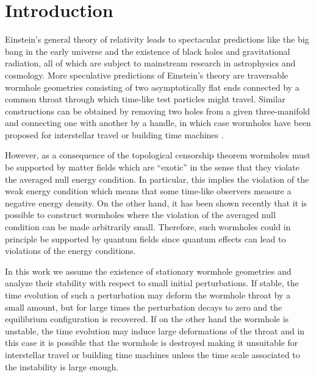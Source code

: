\documentclass[           %
               showpacs,            %
               preprintnumbers,     %
               aps,                 %
               prd,                 %
               superscriptaddress,      %
               nofootinbib,         %
               tightenlines,        %
               floats,floatfix      %
               ]{revtex4}
\begin{document}

\maketitle



\section{Introduction}

Einstein's general theory of relativity leads to spectacular
predictions like the big bang in the early universe and the existence
of black holes and gravitational radiation, all of which are subject
to mainstream research in astrophysics and cosmology. More speculative
predictions of Einstein's theory are traversable wormhole geometries
\cite{mMkT88} consisting of two asymptotically flat ends connected by
a common throat through which time-like test particles might
travel. Similar constructions can be obtained by removing two holes
from a given three-manifold and connecting one with another by a
handle, in which case wormholes have been proposed for interstellar
travel or building time machines \cite{mMkTyU88,vFiN90}.

However, as a consequence of the topological censorship theorem
\cite{jFkSdW93} wormholes must be supported by matter fields which are
``exotic'' in the sense that they violate the averaged null energy
condition. In particular, this implies the violation of the weak
energy condition which means that some time-like observers measure a
negative energy density. On the other hand, it has been shown recently
\cite{mVsKnD03} that it is possible to construct wormholes where the
violation of the averaged null condition can be made arbitrarily
small. Therefore, such wormholes could in principle be supported by
quantum fields since quantum effects can lead to violations of the
energy conditions.

In this work we assume the existence of stationary wormhole geometries
and analyze their stability with respect to small initial
perturbations. If stable, the time evolution of such a perturbation
may deform the wormhole throat by a small amount, but for large times
the perturbation decays to zero and the equilibrium configuration is
recovered. If on the other hand the wormhole is unstable, the time
evolution may induce large deformations of the throat and in this case
it is possible that the wormhole is destroyed making it unsuitable for
interstellar travel or building time machines unless the time scale
associated to the instability is large enough.
\end{document}
